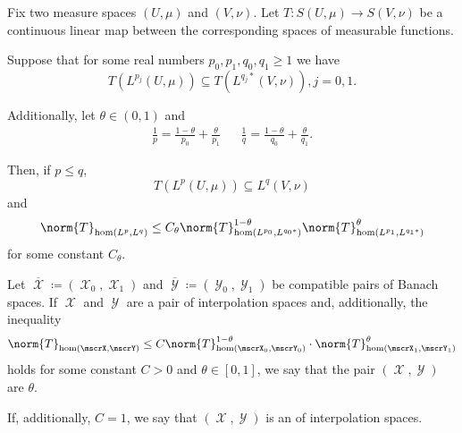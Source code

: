 \begin{theorem}
  Fix two measure spaces \( (U, \mu) \) and \( (V, \nu) \). Let \( T: S(U, \mu) \to S(V, \nu) \) be a continuous linear map between the corresponding spaces of measurable functions.

  Suppose that for some real numbers \( p_0, p_1, q_0, q_1 \geq 1 \) we have
  \begin{equation*}
    T(L^{p_j}(U, \mu)) \subseteq T(L^{q_j *}(V, \nu)), j = 0, 1.
  \end{equation*}

  Additionally, let \( \theta \in (0, 1) \) and
  \begin{align*}
    \frac 1 p = \frac {1 - \theta} {p_0} + \frac {\theta} {p_1}
    &&
    \frac 1 q = \frac {1 - \theta} {q_0} + \frac {\theta} {q_1}.
  \end{align*}

  Then, if \( p \leq q \),
  \begin{equation*}
    T(L^p(U, \mu)) \subseteq L^q(V, \nu)
  \end{equation*}
  and
  \begin{equation*}
    \norm{T}_{\hom(L^p, L^q)} \leq C_\theta \norm{T}_{\hom(L^{p_0}, L^{q_0*})}^{1 - \theta} \norm{T}_{\hom(L^{p_1}, L^{q_1*})}^\theta
  \end{equation*}
  for some constant \( C_\theta \).
\end{theorem}

\begin{definition}\label{def:banach_interpolation_space_exponent}
  Let \( \overline{\mscrX} \coloneqq ( \mscrX_0, \mscrX_1 ) \) and \( \overline{\mscrY} \coloneqq ( \mscrY_0, \mscrY_1 ) \) be compatible pairs of Banach spaces. If \( \mscrX \) and \( \mscrY \) are a pair of interpolation spaces and, additionally, the inequality
  \begin{equation}\label{da:def:banach_interpolation_space_exponent}
    \norm{T}_{\hom(\mscrX, \mscrY)} \leq C \norm{T}_{\hom(\mscrX_0, \mscrY_0)}^{1-\theta} \cdot \norm{T}_{\hom(\mscrX_1, \mscrY_1)}^{\theta}
  \end{equation}
  holds for some constant \( C > 0 \) and \( \theta \in [0, 1] \), we say that the pair \( (\mscrX, \mscrY) \) are  \( \theta \).

  If, additionally, \( C = 1 \), we say that \( (\mscrX, \mscrY) \) is an  of interpolation spaces.
\end{definition}

